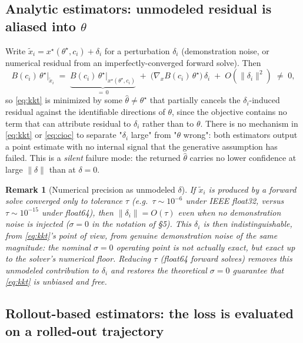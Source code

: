 \documentclass[11pt]{article}
\newtheorem{remark}{Remark}
\newcommand{\theovec}{\theta}
\newcommand{\xdemo}{\tilde{x}}
\begin{document}
\subsection{Analytic estimators: unmodeled residual is aliased into $\theovec$}

Write $\xdemo_i = x^\star(\theovec^\star,c_i) + \delta_i$ for a perturbation
$\delta_i$ (demonstration noise, or numerical residual from an
imperfectly-converged forward solve). Then
\begin{equation}
  B(c_i)\,\theovec^\star \Big|_{\xdemo_i}
  \;=\; \underbrace{B(c_i)\,\theovec^\star\Big|_{x^\star(\theovec^\star,c_i)}}_{=\,0}
  \;+\; \big(\nabla_x B(c_i)\,\theovec^\star\big)\,\delta_i \;+\; O(\|\delta_i\|^2)
  \;\ne\; 0,
\end{equation}
so \eqref{eq:kkt} is minimized by some $\hat\theovec \ne \theovec^\star$ that
partially cancels the $\delta_i$-induced residual against the identifiable
directions of $\theovec$, since the objective contains no term that can
attribute residual to $\delta_i$ rather than to $\theovec$. There is no
mechanism in \eqref{eq:kkt} or \eqref{eq:cioc} to separate "$\delta_i$ large"
from "$\theovec$ wrong": both estimators output a point estimate with no
internal signal that the generative assumption has failed. This is a
\emph{silent} failure mode: the returned $\hat\theovec$ carries no lower
confidence at large $\|\delta\|$ than at $\delta = 0$.

\begin{remark}[Numerical precision as unmodeled $\delta$]
If $\xdemo_i$ is produced by a forward solve converged only to tolerance
$\tau$ (e.g.\ $\tau \sim 10^{-6}$ under IEEE float32, versus
$\tau \sim 10^{-15}$ under float64), then $\|\delta_i\| = O(\tau)$ even when
no demonstration noise is injected ($\sigma = 0$ in the notation of \S5). This
$\delta_i$ is then indistinguishable, from \eqref{eq:kkt}'s point of view,
from genuine demonstration noise of the same magnitude: the nominal
$\sigma = 0$ operating point is not actually exact, but exact up to the
solver's numerical floor. Reducing $\tau$ (float64 forward solves) removes
this unmodeled contribution to $\delta_i$ and restores the theoretical
$\sigma = 0$ guarantee that \eqref{eq:kkt} is unbiased and free.
\end{remark}

\subsection{Rollout-based estimators: the loss is evaluated on a rolled-out trajectory}
\end{document}
